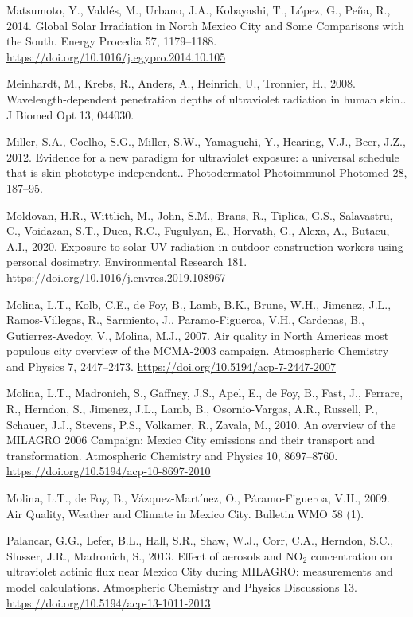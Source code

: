 \documentclass[10pt]{article}
\begin{document}
\label{csl:17}Matsumoto, Y., Vald{\'{e}}s, M., Urbano, J.A., Kobayashi, T., L{\'{o}}pez, G., Pe{\~{n}}a, R., 2014. {Global Solar Irradiation in North Mexico City and Some Comparisons with the South}. Energy Procedia 57, 1179–1188. \url{https://doi.org/10.1016/j.egypro.2014.10.105}

\label{csl:34}Meinhardt, M., Krebs, R., Anders, A., Heinrich, U., Tronnier, H., 2008. {Wavelength-dependent penetration depths of ultraviolet radiation in human skin.}. J Biomed Opt 13, 044030.

\label{csl:35}Miller, S.A., Coelho, S.G., Miller, S.W., Yamaguchi, Y., Hearing, V.J., Beer, J.Z., 2012. {Evidence for a new paradigm for ultraviolet exposure: a universal schedule that is skin phototype independent.}. Photodermatol Photoimmunol Photomed 28, 187–95.

\label{csl:53}Moldovan, H.R., Wittlich, M., John, S.M., Brans, R., Tiplica, G.S., Salavastru, C., Voidazan, S.T., Duca, R.C., Fugulyan, E., Horvath, G., Alexa, A., Butacu, A.I., 2020. {Exposure to solar {UV} radiation in outdoor construction workers using personal dosimetry}. Environmental Research 181. \url{https://doi.org/10.1016/j.envres.2019.108967}

\label{csl:3}Molina, L.T., Kolb, C.E., de Foy, B., Lamb, B.K., Brune, W.H., Jimenez, J.L., Ramos-Villegas, R., Sarmiento, J., Paramo-Figueroa, V.H., Cardenas, B., Gutierrez-Avedoy, V., Molina, M.J., 2007. {Air quality in North America{\textquotesingle}s most populous city {\textendash} overview of the {MCMA}-2003 campaign}. Atmospheric Chemistry and Physics 7, 2447–2473. \url{https://doi.org/10.5194/acp-7-2447-2007}

\label{csl:4}Molina, L.T., Madronich, S., Gaffney, J.S., Apel, E., de Foy, B., Fast, J., Ferrare, R., Herndon, S., Jimenez, J.L., Lamb, B., Osornio-Vargas, A.R., Russell, P., Schauer, J.J., Stevens, P.S., Volkamer, R., Zavala, M., 2010. {An overview of the MILAGRO 2006 Campaign: Mexico City emissions and their transport and transformation}. Atmospheric Chemistry and Physics 10, 8697–8760. \url{https://doi.org/10.5194/acp-10-8697-2010}

\label{csl:65}Molina, L.T., de Foy, B., Vázquez-Martínez, O., Páramo-Figueroa, V.H., 2009. {Air Quality, Weather and Climate in Mexico City}. Bulletin WMO 58 (1).

\label{csl:13}Palancar, G.G., Lefer, B.L., Hall, S.R., Shaw, W.J., Corr, C.A., Herndon, S.C., Slusser, J.R., Madronich, S., 2013. {Effect of aerosols and NO$_2$ concentration on ultraviolet actinic flux near Mexico City during MILAGRO: measurements and model calculations}. Atmospheric Chemistry and Physics Discussions 13. \url{https://doi.org/10.5194/acp-13-1011-2013}
\end{document}
